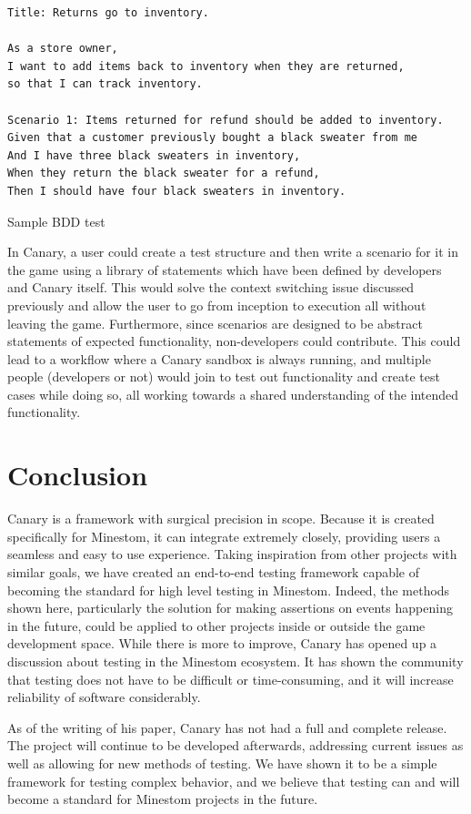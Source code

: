 \documentclass[12pt]{article}
\begin{document}
\begin{onehalfspacing}
\begin{listing}[H]
\begin{verbatim}
Title: Returns go to inventory.

As a store owner,
I want to add items back to inventory when they are returned,
so that I can track inventory.

Scenario 1: Items returned for refund should be added to inventory.
Given that a customer previously bought a black sweater from me
And I have three black sweaters in inventory,
When they return the black sweater for a refund,
Then I should have four black sweaters in inventory.
\end{verbatim}
\caption{Sample BDD test}
\label{lst:5_2_3_1}
\end{listing}

In Canary, a user could create a test structure and then write a
scenario for it in the game using a library of statements which have
been defined by developers and Canary itself. This would solve the
context switching issue discussed previously and allow the user to go
from inception to execution all without leaving the game. Furthermore,
since scenarios are designed to be abstract statements of expected
functionality, non-developers could contribute. This could lead to a
workflow where a Canary sandbox is always running, and multiple people
(developers or not) would join to test out functionality and create test
cases while doing so, all working towards a shared understanding of the
intended functionality.

\newpage
\section{Conclusion}

Canary is a framework with surgical precision in scope. Because it is
created specifically for Minestom, it can integrate extremely closely,
providing users a seamless and easy to use experience. Taking
inspiration from other projects with similar goals, we have created an
end-to-end testing framework capable of becoming the standard for high
level testing in Minestom. Indeed, the methods shown here, particularly
the solution for making assertions on events happening in the future,
could be applied to other projects inside or outside the game
development space. While there is more to improve, Canary has opened up
a discussion about testing in the Minestom ecosystem. It has shown the
community that testing does not have to be difficult or time-consuming,
and it will increase reliability of software considerably.

As of the writing of his paper, Canary has not had a full and complete
release. The project will continue to be developed afterwards,
addressing current issues as well as allowing for new methods of
testing. We have shown it to be a simple framework for testing complex
behavior, and we believe that testing can and will become a standard for
Minestom projects in the future.

\end{onehalfspacing} %
\end{document}
